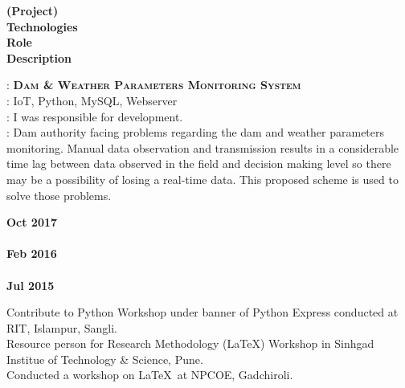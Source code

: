 \documentclass[a4paper,11pt]{memoir} %
\begin{document}
\begin{minipage}[t]{0.20\columnwidth}
\textbf{(Project)}\\
\textbf{Technologies}\\
\textbf{Role}\\
\textbf{Description}
\end{minipage}
\hfill
\begin{minipage}[t]{0.80\columnwidth}
: \textbf{\textsc{Dam \& Weather Parameters Monitoring System}}\\
: IoT, Python, MySQL, Webserver\\
: I was responsible for development.\\
: Dam authority facing problems regarding the dam and weather parameters monitoring. 
Manual data observation and transmission results in a considerable time lag between data observed in the field and decision making level so there may be a possibility of losing a real-time data. 
This proposed scheme is used to solve those problems.
\end{minipage}


\Sep %
\begin{minipage}[t]{0.15\columnwidth}
\textbf{Oct 2017}\\
\\
\textbf{Feb 2016}\\
\\
\textbf{Jul 2015} 
\end{minipage}
\hfill
\begin{minipage}[t]{0.85\columnwidth}
Contribute to Python Workshop under banner of Python Express conducted at RIT, Islampur, Sangli.\\
Resource person for Research Methodology (\LaTeX) Workshop in 
Sinhgad Institue of Technology \& Science, Pune.\\
Conducted a workshop on \LaTeX \, at NPCOE, Gadchiroli.
\end{minipage}





\Sep %
\end{document}
